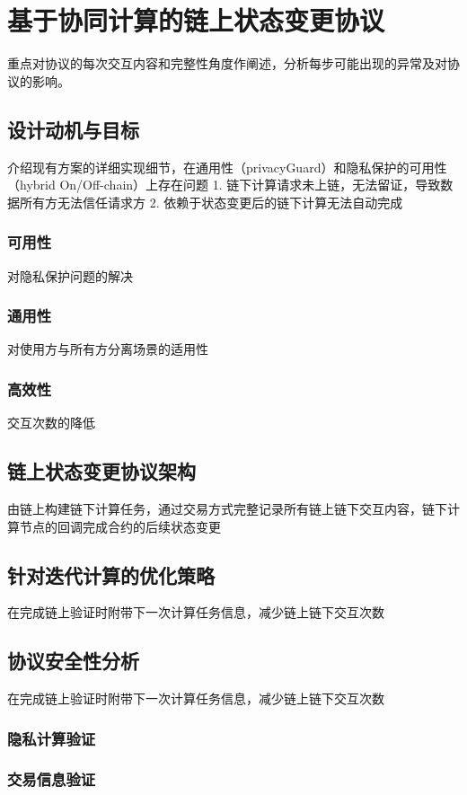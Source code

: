 \chapter{基于协同计算的链上状态变更协议}
重点对协议的每次交互内容和完整性角度作阐述，分析每步可能出现的异常及对协议的影响。

\section{设计动机与目标}
介绍现有方案的详细实现细节，在通用性（privacyGuard）和隐私保护的可用性（hybrid On/Off-chain）上存在问题
1. 链下计算请求未上链，无法留证，导致数据所有方无法信任请求方
2. 依赖于状态变更后的链下计算无法自动完成
\subsection{可用性}
对隐私保护问题的解决

\subsection{通用性}
对使用方与所有方分离场景的适用性

\subsection{高效性}
交互次数的降低

\section{链上状态变更协议架构}
由链上构建链下计算任务，通过交易方式完整记录所有链上链下交互内容，链下计算节点的回调完成合约的后续状态变更

\section{针对迭代计算的优化策略}
在完成链上验证时附带下一次计算任务信息，减少链上链下交互次数

\section{协议安全性分析}
在完成链上验证时附带下一次计算任务信息，减少链上链下交互次数

\subsection{隐私计算验证}

\subsection{交易信息验证}